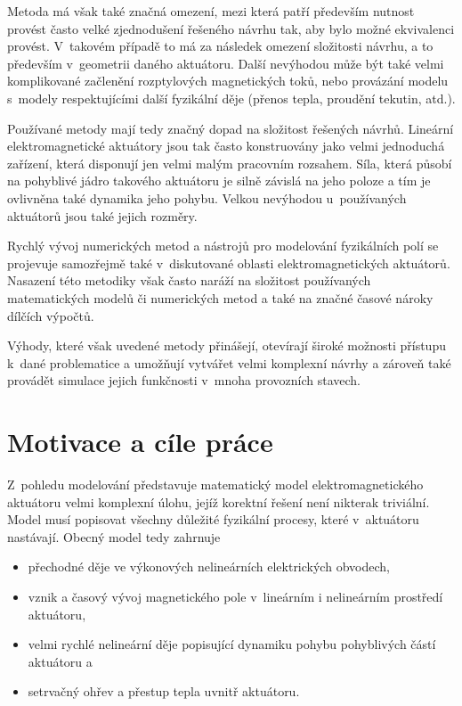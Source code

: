 Metoda má však také značná omezení, mezi která patří především nutnost provést často velké zjednodušení řešeného návrhu tak, aby bylo možné ekvivalenci provést. V~takovém případě to má za následek omezení složitosti návrhu, a to především v~geometrii daného aktuátoru. Další nevýhodou může být také velmi komplikované začlenění rozptylových magnetických toků, nebo provázání modelu s~modely respektujícími další fyzikální děje (přenos tepla, proudění tekutin, atd.). \cite{gomis2010design}

Používané metody mají tedy značný dopad na složitost řešených návrhů. Lineární elektromagnetické aktuátory jsou tak často konstruovány jako velmi jednoduchá zařízení, která disponují jen velmi malým pracovním rozsahem. Síla, která působí na pohyblivé jádro takového aktuátoru je silně závislá na jeho poloze a tím je ovlivněna také dynamika jeho pohybu. Velkou nevýhodou u~používaných aktuátorů jsou také jejich rozměry.

Rychlý vývoj numerických metod a nástrojů pro modelování fyzikálních polí se projevuje samozřejmě také v~diskutované oblasti elektromagnetických aktuátorů. Nasazení této metodiky však často naráží na složitost používaných matematických modelů či numerických metod a také na značné časové nároky dílčích výpočtů. \cite{brauer2006magnetic}

Výhody, které však uvedené metody přinášejí, otevírají široké možnosti přístupu k~dané problematice a umožňují vytvářet velmi komplexní návrhy a zároveň také provádět simulace jejich funkčnosti v~mnoha provozních stavech. \cite{5484675} \cite{6265943}

\section{Motivace a cíle práce}
Z~pohledu modelování představuje matematický model elektromagnetického aktuátoru velmi komplexní úlohu, jejíž korektní řešení není nikterak triviální. Model musí popisovat všechny důležité fyzikální procesy, které v~aktuátoru nastávají. Obecný model tedy zahrnuje
\begin{itemize}
    \item přechodné děje ve výkonových nelineárních elektrických obvodech,
    \item vznik a časový vývoj magnetického pole v~lineárním i nelineárním prostředí aktuátoru,
    \item velmi rychlé nelineární děje popisující dynamiku pohybu pohyblivých částí aktuátoru a
    \item setrvačný ohřev a přestup tepla uvnitř aktuátoru.
\end{itemize}

